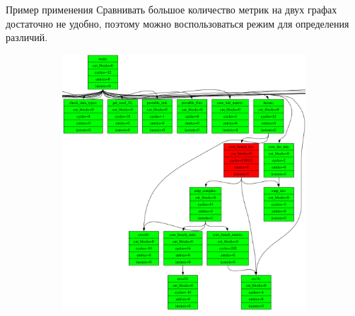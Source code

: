 \documentclass[10pt,aspectratio=169,hyperref={pdftex,unicode},xcolor=dvipsnames]{beamer}
\begin{document}
\begin{frame}{ Пример применения }
    Сравнивать большое количество метрик на двух графах достаточно
    не удобно, поэтому можно воспользоваться режим для определения различий.



    \pause
    \begin{figure}
        \begin{subfigure}{0.45\textwidth}
            \centering
            \includegraphics[height=0.7\textheight,keepaspectratio]{./images/stac_diff.png}
        \end{subfigure}
        \begin{subfigure}{0.45\textwidth}
            \centering
\end{subfigure}
\end{figure}
\end{frame}
\end{document}
